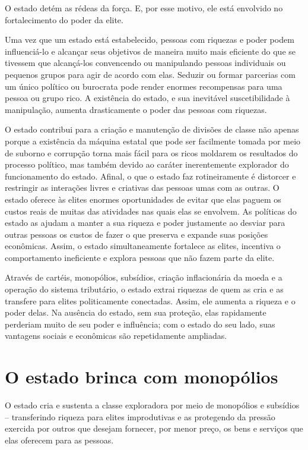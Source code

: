 O estado detém as rédeas da força. E, por esse motivo, ele está envolvido no fortalecimento do poder da elite. 

Uma vez que um estado está estabelecido, pessoas com riquezas e poder podem influenciá-lo e alcançar seus objetivos de maneira muito mais eficiente do que se tivessem que alcançá-los convencendo ou manipulando pessoas individuais ou pequenos grupos para agir de acordo com elas. Seduzir ou formar parcerias com um único político ou burocrata pode render enormes recompensas para uma pessoa ou grupo rico. A existência do estado, e sua inevitável suscetibilidade à manipulação, aumenta drasticamente o poder das pessoas com riquezas.

O estado contribui para a criação e manutenção de divisões de classe não apenas porque a existência da máquina estatal que pode ser facilmente tomada por meio de suborno e corrupção torna mais fácil para os ricos moldarem os resultados do processo político, mas também devido ao caráter inerentemente explorador do funcionamento do estado. Afinal, o que o estado faz rotineiramente é distorcer e restringir as interações livres e criativas das pessoas umas com as outras. O estado oferece às elites enormes oportunidades de evitar que elas paguem os custos reais de muitas das atividades nas quais elas se envolvem. As políticas do estado as ajudam a manter a sua riqueza e poder justamente ao desviar para outras pessoas os custos de fazer o que preserva e expande suas posições econômicas. Assim, o estado simultaneamente fortalece as elites, incentiva o comportamento ineficiente e explora pessoas que não fazem parte da elite.

Através de cartéis, monopólios, subsídios, criação inflacionária da moeda e a operação do sistema tributário, o estado extrai riquezas de quem as cria e as transfere para elites politicamente conectadas. Assim, ele aumenta a riqueza e o poder delas. Na ausência do estado, sem sua proteção, elas rapidamente perderiam muito de seu poder e influência; com o estado do seu lado, suas vantagens sociais e econômicas são repetidamente ampliadas.

\section{O estado brinca com monopólios}

O estado cria e sustenta a classe exploradora por meio de monopólios e subsídios -- transferindo riqueza para elites improdutivas e as protegendo da pressão exercida por outros que desejam fornecer, por menor preço, os bens e serviços que elas oferecem para as pessoas.


